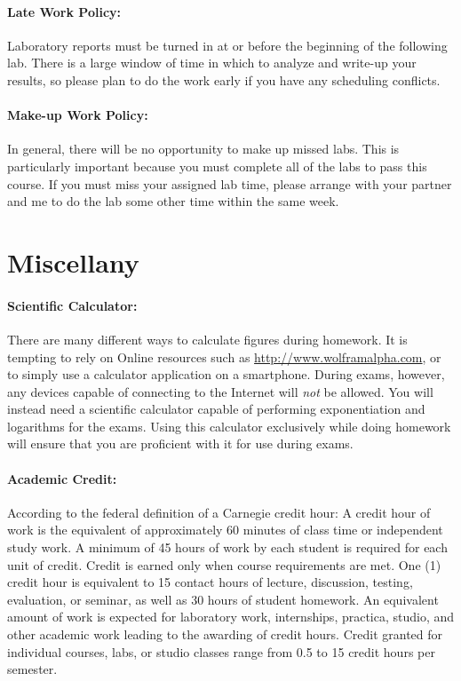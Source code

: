 \documentclass[12pt, letterpaper]{article}
\begin{document}
\paragraph{Late Work Policy:}
Laboratory reports must be turned in at or before the beginning of the following lab. There is a large window of time in which to analyze and write-up your results, so please plan to do the work early if you have any scheduling conflicts.

\paragraph{Make-up Work Policy:}
In general, there will be no opportunity to make up missed labs. This is particularly important because you must complete all of the labs to pass this course. If you must miss your assigned lab time, please arrange with your partner and me to do the lab some other time within the same week.


\section*{Miscellany}
\paragraph{Scientific Calculator:}
There are many different ways to calculate figures during homework. It is tempting to rely on Online resources such as \href{http://www.wolframalpha.com}{http://www.wolframalpha.com}, or to simply use a calculator application on a smartphone. During exams, however, any devices capable of connecting to the Internet will \emph{not} be allowed. You will instead need a scientific calculator capable of performing exponentiation and logarithms for the exams. Using this calculator exclusively while doing homework will ensure that you are proficient with it for use during exams.

\paragraph{Academic Credit:}
According to the federal definition of a Carnegie credit hour: A credit hour of work is the equivalent of approximately 60 minutes of class time or independent study work. A minimum of 45 hours of work by each student is required for each unit of credit. Credit is earned only when course requirements are met. One (1) credit hour is equivalent to 15 contact hours of lecture, discussion, testing, evaluation, or seminar, as well as 30 hours of student homework. An equivalent amount of work is expected for laboratory work, internships, practica, studio, and other academic work leading to the awarding of credit hours. Credit granted for individual courses, labs, or studio classes range from 0.5 to 15 credit hours per semester.
\end{document}
